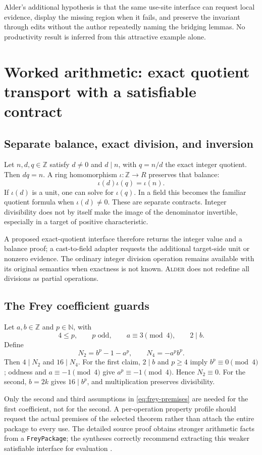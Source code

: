 \documentclass[11pt,a4paper]{article}
\newcommand{\code}[1]{\nolinkurl{#1}}
\newcommand{\Alder}{\textsc{Alder}}
\newcommand{\N}{\mathbb N}\newcommand{\Z}{\mathbb Z}\newcommand{\Q}{\mathbb Q}\newcommand{\R}{\mathbb R}
\theoremstyle{plain}
\theoremstyle{definition}
\theoremstyle{remark}
\begin{document}
Alder's additional hypothesis is that the same use-site interface can request local evidence, display the missing region when it fails, and preserve the invariant through edits without the author repeatedly naming the bridging lemmas. No productivity result is inferred from this attractive example alone.

\section{Worked arithmetic: exact quotient transport with a satisfiable contract}\label{sec:frey}

\subsection{Separate balance, exact division, and inversion}
Let $n,d,q\in\Z$ satisfy $d\ne0$ and $d\mid n$, with $q=n/d$ the exact integer quotient. Then $dq=n$. A ring homomorphism $\iota:\Z\to R$ preserves that balance:
\[
 \iota(d)\iota(q)=\iota(n).
\]
If $\iota(d)$ is a unit, one can solve for $\iota(q)$. In a field this becomes the familiar quotient formula when $\iota(d)\ne0$. These are separate contracts. Integer divisibility does not by itself make the image of the denominator invertible, especially in a target of positive characteristic.

A proposed exact-quotient interface therefore returns the integer value and a balance proof; a cast-to-field adapter requests the additional target-side unit or nonzero evidence. The ordinary integer division operation remains available with its original semantics when exactness is not known. \Alder{} does not redefine all divisions as partial operations.

\subsection{The Frey coefficient guards}
Let $a,b\in\Z$ and $p\in\N$, with
\begin{equation}\label{eq:frey-premises}
 4\le p,\qquad p\text{ odd},\qquad a\equiv3\pmod4,\qquad 2\mid b.
\end{equation}
Define
\[
 N_2=b^p-1-a^p,\qquad N_4=-a^p b^p.
\]
Then $4\mid N_2$ and $16\mid N_4$. For the first claim, $2\mid b$ and $p\ge4$ imply $b^p\equiv0\pmod4$; oddness and $a\equiv-1\pmod4$ give $a^p\equiv-1\pmod4$. Hence $N_2\equiv0$. For the second, $b=2k$ gives $16\mid b^p$, and multiplication preserves divisibility.

Only the second and third assumptions in \eqref{eq:frey-premises} are needed for the first coefficient, not for the second. A per-operation property profile should request the actual premises of the selected theorem rather than attach the entire package to every use. The detailed source proof obtains stronger arithmetic facts from a \code{FreyPackage}; the syntheses correctly recommend extracting this weaker satisfiable interface for evaluation \cite{frey,r3a,r3b}.
\end{document}
